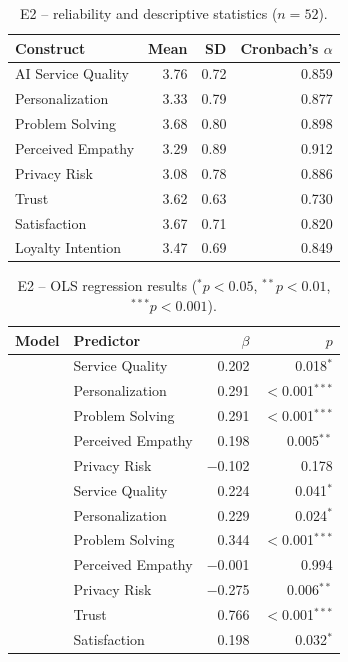 \documentclass[runningheads]{llncs}
\begin{document}
\begin{table}[t]
\caption{E2 -- reliability and descriptive statistics ($n=52$).}\label{tab:e2rel}
\centering
\begin{tabular}{@{}lrrr@{}}
\toprule
Construct & Mean & SD & Cronbach's $\alpha$ \\
\midrule
AI Service Quality & 3.76 & 0.72 & 0.859 \\
Personalization & 3.33 & 0.79 & 0.877 \\
Problem Solving & 3.68 & 0.80 & 0.898 \\
Perceived Empathy & 3.29 & 0.89 & 0.912 \\
Privacy Risk & 3.08 & 0.78 & 0.886 \\
Trust & 3.62 & 0.63 & 0.730 \\
Satisfaction & 3.67 & 0.71 & 0.820 \\
Loyalty Intention & 3.47 & 0.69 & 0.849 \\
\bottomrule
\end{tabular}
\end{table}

\begin{table}[t]
\caption{E2 -- OLS regression results ($^{*}p<0.05$, $^{**}p<0.01$, $^{***}p<0.001$).}\label{tab:e2reg}
\centering
\begin{tabular}{@{}llrr@{}}
\toprule
Model & Predictor & $\beta$ & $p$ \\
\midrule
{}
 & Service Quality & 0.202 & 0.018$^{*}$ \\
 & Personalization & 0.291 & $<$0.001$^{***}$ \\
 & Problem Solving & 0.291 & $<$0.001$^{***}$ \\
 & Perceived Empathy & 0.198 & 0.005$^{**}$ \\
 & Privacy Risk & $-$0.102 & 0.178 \\
\midrule
{}
 & Service Quality & 0.224 & 0.041$^{*}$ \\
 & Personalization & 0.229 & 0.024$^{*}$ \\
 & Problem Solving & 0.344 & $<$0.001$^{***}$ \\
 & Perceived Empathy & $-$0.001 & 0.994 \\
 & Privacy Risk & $-$0.275 & 0.006$^{**}$ \\
\midrule
{}
 & Trust & 0.766 & $<$0.001$^{***}$ \\
 & Satisfaction & 0.198 & 0.032$^{*}$ \\
\bottomrule
\end{tabular}
\end{table}
\end{document}
